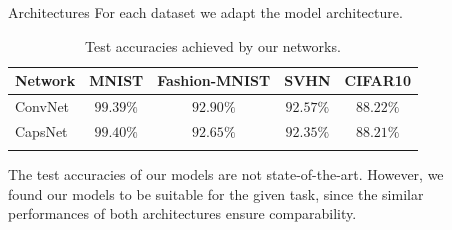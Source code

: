 \documentclass[final]{beamer}
\newlength{\sepwid}
\newlength{\onecolwid}
\newlength{\twocolwid}
\begin{document}
\begin{frame}[t]
\begin{columns}[t]
\begin{column}{\onecolwid}
			
			
		\end{column} %
		
		\begin{column}{\sepwid}\end{column} %
		
		\begin{column}{\twocolwid} %
			
			\begin{columns}[t,totalwidth=\twocolwid] %
				
				\begin{column}{\onecolwid}\vspace{-.6in} %
					
					
					\begin{block}{Architectures}
						For each dataset we adapt the model architecture.
						\vspace{1cm}
						
						\begin{table}[h]
							\centering\small{
								\begin{tabular}{lcccc}
									\toprule
									Network       & MNIST & Fashion-MNIST & SVHN & CIFAR10  \\
									\midrule
									ConvNet           & $99.39\%$ & $92.90\%$ & $92.57\%$ & $88.22\%$ \\
									CapsNet           & $99.40\%$ & $92.65\%$ & $92.35\%$ & $88.21\%$ \\
									\bottomrule\\
							\end{tabular}}
							\caption{\phantom{T}Test accuracies achieved by our networks.}
						\end{table}
						
						The test accuracies of our models are not state-of-the-art. However, we found our models to be suitable for the given task, since the similar performances of both architectures ensure comparability. 
						
					\end{block}
					

\end{column}
\end{columns}
\end{column}
\end{columns}
\end{frame}
\end{document}
